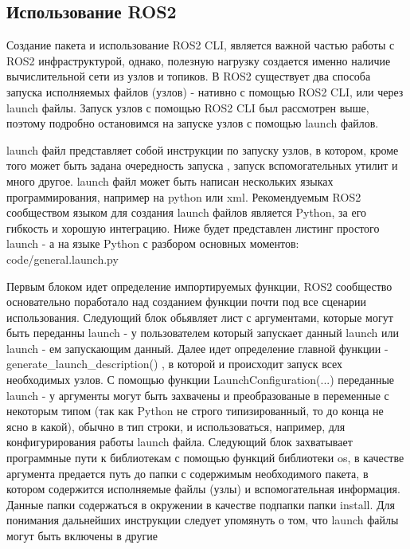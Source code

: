 \documentclass[a4paper, 14pt]{extreport}
\begin{document}
\subsection{Использование ROS2}
\par Создание пакета и использование ROS2 CLI, является важной частью работы с ROS2 инфраструктурой, однако, полезную нагрузку создается
 именно наличие вычислительной сети из узлов и топиков. В ROS2 существует два способа запуска исполняемых файлов (узлов) - нативно с 
 помощью ROS2 CLI, или через launch файлы. Запуск узлов с помощью ROS2 CLI был рассмотрен выше, поэтому подробно остановимся на 
 запуске узлов с помощью launch файлов.
\par\noindent launch файл представляет собой инструкции по запуску узлов, в котором, кроме того может быть задана очередность запуска
, запуск вспомогательных утилит и много другое. launch файл может быть написан нескольких языках программирования, например на python
или xml. Рекомендуемым ROS2 сообществом языком для создания launch файлов является Python\cite{pythonBook}\cite{pythonBook1}, за его гибкость и хорошую интеграцию.
Ниже будет представлен листинг простого launch - а на языке Python с разбором основных моментов:
 {code/general.launch.py}
\par\noindent Первым блоком идет определение импортируемых функции, ROS2 сообщество основательно поработало над созданием функции
почти под все сценарии использования. Следующий блок обьявляет лист с аргументами, которые могут быть переданны launch - у пользователем
который запускает данный launch или launch - ем запускающим данный. Далее идет определение главной функции - generate\_launch\_description()
, в которой и происходит запуск всех необходимых узлов. С помощью функции LaunchConfiguration(...) переданные launch - у аргументы
могут быть захвачены и преобразованые в переменные с некоторым типом (так как Python не строго типизированный, то до конца не ясно
в какой), обычно в тип строки, и использоваться, например, для конфигурирования работы launch файла. Следующий блок захватывает 
программные пути к библиотекам с помощью функций библиотеки os, в качестве аргумента предается путь до папки с содержимым необходимого
пакета, в котором содержится исполняемые файлы (узлы) и вспомогательная информация. Данные папки содержаться в окружении в качестве
подпапки папки install. Для понимания дальнейших инструкции следует упомянуть о том, что launch файлы могут быть включены в другие 
\end{document}
